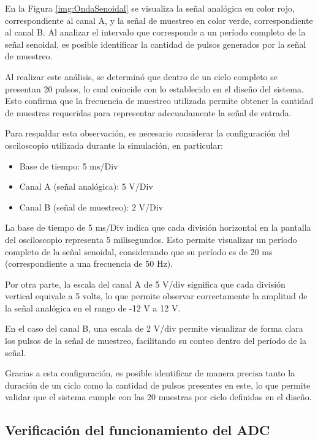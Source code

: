 \documentclass[12pt, a4paper]{article}
\begin{document}
    En la Figura \ref{img:OndaSenoidal}  se visualiza la señal analógica en color rojo, correspondiente al canal A, y la señal de muestreo en color verde, correspondiente al canal B. Al analizar el intervalo que corresponde a un período completo de la señal senoidal, es posible identificar la cantidad de pulsos generados por la señal de muestreo.

    Al realizar este análisis, se determinó que dentro de un ciclo completo se presentan 20 pulsos, lo cual coincide con lo establecido en el diseño del sistema. Esto confirma que la frecuencia de muestreo utilizada permite obtener la cantidad de muestras requeridas para representar adecuadamente la señal de entrada.

    Para respaldar esta observación, es necesario considerar la configuración del osciloscopio utilizada durante la simulación, en particular:

    \begin{itemize}
        \item Base de tiempo: 5 ms/Div
        \item Canal A (señal analógica): 5 V/Div
        \item Canal B (señal de muestreo): 2 V/Div
    \end{itemize}

    La base de tiempo de 5 ms/Div indica que cada división horizontal en la pantalla del osciloscopio representa 5 milisegundos. Esto permite visualizar un período completo de la señal senoidal, considerando que su período es de 20 ms (correspondiente a una frecuencia de 50 Hz).

    Por otra parte, la escala del canal A de 5 V/div significa que cada división vertical equivale a 5 volts, lo que permite observar correctamente la amplitud de la señal analógica en el rango de -12 V a 12 V.

    En el caso del canal B, una escala de 2 V/div permite visualizar de forma clara los pulsos de la señal de muestreo, facilitando su conteo dentro del período de la señal.

    Gracias a esta configuración, es posible identificar de manera precisa tanto la duración de un ciclo como la cantidad de pulsos presentes en este, lo que permite validar que el sistema cumple con las 20 muestras por ciclo definidas en el diseño.

    \subsection{Verificación del funcionamiento del ADC}
\end{document}
